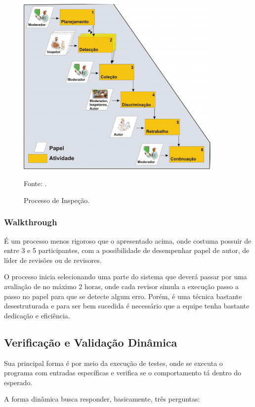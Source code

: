 \documentclass[runningheads]{llncs}
\begin{document}
\begin{figure}[h]
    \centering
    \includegraphics[width=10cm]{inspecao.png}
    \caption{Processo de Inspeção.}
    Fonte: \cite{ref_article1}.
    \label{fig:inspecao.png}
\end{figure}

\subsubsection{Walkthrough} É um processo menos rigoroso que o apresentado acima, onde costuma possuir de entre 3 e 5 participantes, com a possibilidade de desempenhar papel de autor, de líder de revisões ou de revisores.

O processo inicia selecionando uma parte do sistema que deverá passar por uma avaliação de no máximo 2 horas, onde cada revisor simula a execução passo a passo no papel para que se detecte algum erro. Porém, é uma técnica bastante desestruturada e para ser bem sucedida é necessário que a equipe tenha bastante dedicação e eficiência.

\subsection{Verificação e Validação Dinâmica}
Sua principal forma é por meio da execução de testes, onde se executa o programa com entradas específicas e verifica se o comportamento tá dentro do esperado.

A forma dinâmica busca responder, basicamente, três perguntas:
\end{document}
